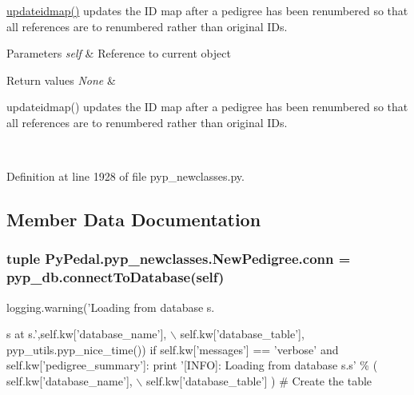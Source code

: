 \hyperlink{classPyPedal_1_1pyp__newclasses_1_1NewPedigree_a5f2e95dd43e8bf2b4bfa2907eebd62a1}{updateidmap()} updates the ID map after a pedigree has been renumbered so that all references are to renumbered rather than original IDs. 


\begin{DoxyParams}{Parameters}
{\em self} & Reference to current object \\
\hline
\end{DoxyParams}

\begin{DoxyRetVals}{Return values}
{\em None} & \begin{DoxyVerb}
updateidmap() updates the ID map after a pedigree has been renumbered so that
all references are to renumbered rather than original IDs.
\end{DoxyVerb}
 \\
\hline
\end{DoxyRetVals}


Definition at line 1928 of file pyp\_\-newclasses.py.



\subsection{Member Data Documentation}
\hypertarget{classPyPedal_1_1pyp__newclasses_1_1NewPedigree_a76f7cf65bd46330008eeb3305e77c980}{
\subsubsection[{conn}]{\setlength{\rightskip}{0pt plus 5cm}tuple {\bf PyPedal.pyp\_\-newclasses.NewPedigree.conn} = pyp\_\-db.connectToDatabase(self)}}
\label{classPyPedal_1_1pyp__newclasses_1_1NewPedigree_a76f7cf65bd46330008eeb3305e77c980}


logging.warning('Loading from database s. 

s at s.',self.kw\mbox{[}'database\_\-name'\mbox{]}, $\backslash$ self.kw\mbox{[}'database\_\-table'\mbox{]}, pyp\_\-utils.pyp\_\-nice\_\-time()) if self.kw\mbox{[}'messages'\mbox{]} == 'verbose' and self.kw\mbox{[}'pedigree\_\-summary'\mbox{]}: print '\mbox{[}INFO\mbox{]}: Loading from database s.s' \% ( self.kw\mbox{[}'database\_\-name'\mbox{]}, $\backslash$ self.kw\mbox{[}'database\_\-table'\mbox{]} ) \# Create the table 

